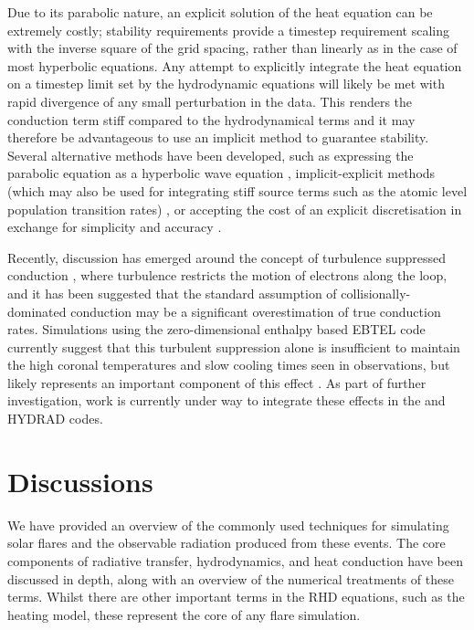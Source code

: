 Due to its parabolic nature, an explicit solution of the heat equation can be extremely costly; stability requirements provide a timestep requirement scaling with the inverse square of the grid spacing, rather than linearly as in the case of most hyperbolic equations.
Any attempt to explicitly integrate the heat equation on a timestep limit set by the hydrodynamic equations will likely be met with rapid divergence of any small perturbation in the data.
This renders the conduction term stiff compared to the hydrodynamical terms and it may therefore be advantageous to use an implicit method  to guarantee stability.
Several alternative methods have been developed, such as expressing the parabolic equation as a hyperbolic wave equation \citep{Rempel2016}, implicit-explicit methods (which may also be used for integrating stiff source terms such as the atomic level population transition rates) \citep[e.g.][]{Ascher1995}, or accepting the cost of an explicit discretisation in exchange for simplicity and accuracy \citep{Bradshaw2003, Bradshaw2013}.

Recently, discussion has emerged around the concept of turbulence suppressed conduction \citep{Bian2016}, where turbulence restricts the motion of electrons along the loop, and it has been suggested that the standard assumption of collisionally-dominated conduction may be a significant overestimation of true conduction rates.
Simulations using the zero-dimensional enthalpy based EBTEL code \citep{Klimchuk2008} currently suggest that this turbulent suppression alone is insufficient to maintain the high coronal temperatures and slow cooling times seen in observations, but likely represents an important component of this effect \citep{Bian2018}.
As part of further investigation, work is currently under way to integrate these effects in the \Radyn{} and HYDRAD codes.

\section{Discussions}

We have provided an overview of the commonly used techniques for simulating solar flares and the observable radiation produced from these events.
The core components of radiative transfer, hydrodynamics, and heat conduction have been discussed in depth, along with an overview of the numerical treatments of these terms.
Whilst there are other important terms in the RHD equations, such as the heating model, these represent the core of any flare simulation.

